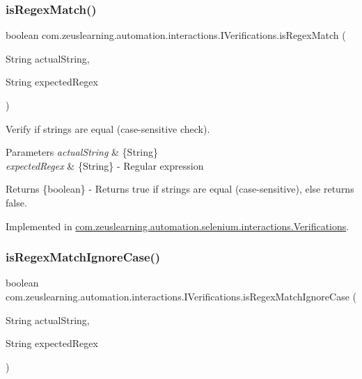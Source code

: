\subsubsection{\texorpdfstring{is\+Regex\+Match()}{isRegexMatch()}}
{\footnotesize\ttfamily boolean com.\+zeuslearning.\+automation.\+interactions.\+I\+Verifications.\+is\+Regex\+Match (\begin{DoxyParamCaption}\item[{String}]{actual\+String,  }\item[{String}]{expected\+Regex }\end{DoxyParamCaption})}

Verify if strings are equal (case-\/sensitive check).


\begin{DoxyParams}{Parameters}
{\em actual\+String} & \{String\} \\
\hline
{\em expected\+Regex} & \{String\} -\/ Regular expression \\
\hline
\end{DoxyParams}
\begin{DoxyReturn}{Returns}
\{boolean\} -\/ Returns {\ttfamily true} if strings are equal (case-\/sensitive), else returns {\ttfamily false}. 
\end{DoxyReturn}


Implemented in \hyperlink{classcom_1_1zeuslearning_1_1automation_1_1selenium_1_1interactions_1_1Verifications_a748c1f8423f37a1d61524e34d30370ab}{com.\+zeuslearning.\+automation.\+selenium.\+interactions.\+Verifications}.

\hypertarget{interfacecom_1_1zeuslearning_1_1automation_1_1interactions_1_1IVerifications_a7d5af24aac4cb26bca024a0b19c56dad}{}\label{interfacecom_1_1zeuslearning_1_1automation_1_1interactions_1_1IVerifications_a7d5af24aac4cb26bca024a0b19c56dad} 
\subsubsection{\texorpdfstring{is\+Regex\+Match\+Ignore\+Case()}{isRegexMatchIgnoreCase()}}
{\footnotesize\ttfamily boolean com.\+zeuslearning.\+automation.\+interactions.\+I\+Verifications.\+is\+Regex\+Match\+Ignore\+Case (\begin{DoxyParamCaption}\item[{String}]{actual\+String,  }\item[{String}]{expected\+Regex }\end{DoxyParamCaption})}

